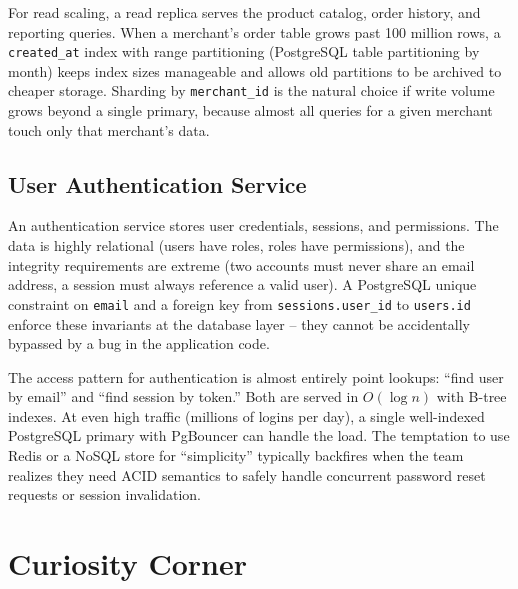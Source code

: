 \documentclass[11pt,a4paper]{article}
\begin{document}
For read scaling, a read replica serves the product catalog, order history, and reporting queries. When a merchant's order table grows past 100 million rows, a \texttt{created\_at} index with range partitioning (PostgreSQL table partitioning by month) keeps index sizes manageable and allows old partitions to be archived to cheaper storage. Sharding by \texttt{merchant\_id} is the natural choice if write volume grows beyond a single primary, because almost all queries for a given merchant touch only that merchant's data.

\subsection{User Authentication Service}

An authentication service stores user credentials, sessions, and permissions. The data is highly relational (users have roles, roles have permissions), and the integrity requirements are extreme (two accounts must never share an email address, a session must always reference a valid user). A PostgreSQL unique constraint on \texttt{email} and a foreign key from \texttt{sessions.user\_id} to \texttt{users.id} enforce these invariants at the database layer -- they cannot be accidentally bypassed by a bug in the application code.

The access pattern for authentication is almost entirely point lookups: ``find user by email'' and ``find session by token.'' Both are served in $O(\log n)$ with B-tree indexes. At even high traffic (millions of logins per day), a single well-indexed PostgreSQL primary with PgBouncer can handle the load. The temptation to use Redis or a NoSQL store for ``simplicity'' typically backfires when the team realizes they need ACID semantics to safely handle concurrent password reset requests or session invalidation.

\newpage

\section{Curiosity Corner}
\end{document}
